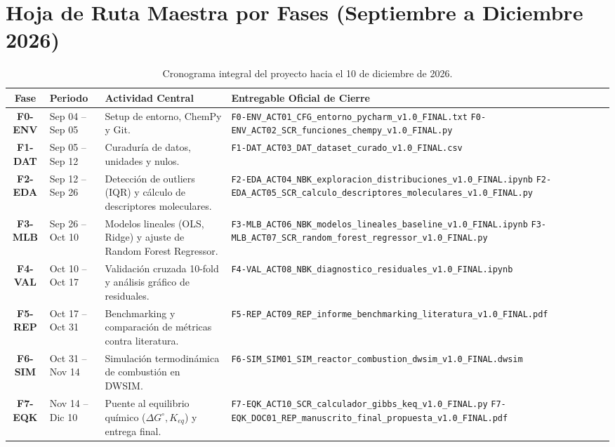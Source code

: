 \documentclass[11pt,letterpaper]{report}
\begin{document}
\section{Hoja de Ruta Maestra por Fases (Septiembre a Diciembre 2026)}

\begin{table}[h!]
\centering
\small
\begin{tabularx}{\textwidth}{c p{3.2cm} p{4.2cm} X}
\toprule
\textbf{Fase} & \textbf{Periodo} & \textbf{Actividad Central} & \textbf{Entregable Oficial de Cierre} \\
\midrule
\rowcolor{codebg}
\textbf{F0-ENV} & Sep 04 -- Sep 05 & Setup de entorno, ChemPy y Git. & \texttt{F0-ENV\_ACT01\_CFG\_entorno\_pycharm\_v1.0\_FINAL.txt} \newline \texttt{F0-ENV\_ACT02\_SCR\_funciones\_chempy\_v1.0\_FINAL.py} \\
\addlinespace
\textbf{F1-DAT} & Sep 05 -- Sep 12 & Curaduría de datos, unidades y nulos. & \texttt{F1-DAT\_ACT03\_DAT\_dataset\_curado\_v1.0\_FINAL.csv} \\
\rowcolor{codebg}
\textbf{F2-EDA} & Sep 12 -- Sep 26 & Detección de outliers (IQR) y cálculo de descriptores moleculares. & \texttt{F2-EDA\_ACT04\_NBK\_exploracion\_distribuciones\_v1.0\_FINAL.ipynb} \newline \texttt{F2-EDA\_ACT05\_SCR\_calculo\_descriptores\_moleculares\_v1.0\_FINAL.py} \\
\addlinespace
\textbf{F3-MLB} & Sep 26 -- Oct 10 & Modelos lineales (OLS, Ridge) y ajuste de Random Forest Regressor. & \texttt{F3-MLB\_ACT06\_NBK\_modelos\_lineales\_baseline\_v1.0\_FINAL.ipynb} \newline \texttt{F3-MLB\_ACT07\_SCR\_random\_forest\_regressor\_v1.0\_FINAL.py} \\
\rowcolor{codebg}
\textbf{F4-VAL} & Oct 10 -- Oct 17 & Validación cruzada 10-fold y análisis gráfico de residuales. & \texttt{F4-VAL\_ACT08\_NBK\_diagnostico\_residuales\_v1.0\_FINAL.ipynb} \\
\addlinespace
\textbf{F5-REP} & Oct 17 -- Oct 31 & Benchmarking y comparación de métricas contra literatura. & \texttt{F5-REP\_ACT09\_REP\_informe\_benchmarking\_literatura\_v1.0\_FINAL.pdf} \\
\rowcolor{codebg}
\textbf{F6-SIM} & Oct 31 -- Nov 14 & Simulación termodinámica de combustión en DWSIM. & \texttt{F6-SIM\_SIM01\_SIM\_reactor\_combustion\_dwsim\_v1.0\_FINAL.dwsim} \\
\addlinespace
\textbf{F7-EQK} & Nov 14 -- Dic 10 & Puente al equilibrio químico ($\Delta G^\circ, K_{eq}$) y entrega final. & \texttt{F7-EQK\_ACT10\_SCR\_calculador\_gibbs\_keq\_v1.0\_FINAL.py} \newline \texttt{F7-EQK\_DOC01\_REP\_manuscrito\_final\_propuesta\_v1.0\_FINAL.pdf} \\
\bottomrule
\end{tabularx}
\caption{Cronograma integral del proyecto hacia el 10 de diciembre de 2026.}
\end{table}
\end{document}
